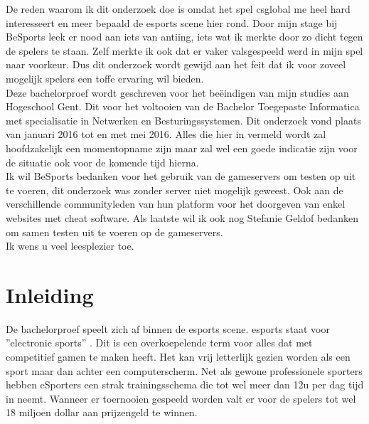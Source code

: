 \documentclass[pdftex,a4paper,12pt,twoside]{report}
\begin{document}
De reden waarom ik dit onderzoek doe is omdat het spel \gls{csglobal} me heel hard interesseert en meer bepaald de \gls{esports} scene hier rond. Door mijn stage bij BeSports leek er nood aan iets van \gls{anti}ing, iets wat ik merkte door zo dicht tegen de spelers te staan. Zelf merkte ik ook dat er vaker valsgespeeld werd in mijn spel naar voorkeur. Dus dit onderzoek wordt gewijd aan het feit dat ik voor zoveel mogelijk spelers een toffe ervaring wil bieden.
\\

Deze bachelorproef wordt geschreven voor het beëindigen van mijn studies aan Hogeschool Gent. Dit voor het voltooien van de Bachelor Toegepaste Informatica met specialisatie in Netwerken en Besturingssystemen. Dit onderzoek vond plaats van januari 2016 tot en met mei 2016. Alles die hier in vermeld wordt zal hoofdzakelijk een momentopname zijn maar zal wel een goede indicatie zijn voor de situatie ook voor de komende tijd hierna.
\\

Ik wil BeSports bedanken voor het gebruik van de gameservers om testen op uit te voeren, dit onderzoek was zonder server niet mogelijk geweest. Ook aan de verschillende communityleden van hun platform voor het doorgeven van enkel websites met \gls{cheat} software. Als laatste wil ik ook nog Stefanie Geldof bedanken om samen testen uit te voeren op de gameservers.
\\

Ik wens u veel leesplezier toe.

\tableofcontents

\printglossary

\chapter{Inleiding}
\label{ch:inleiding}

De bachelorproef speelt zich af binnen de \gls{esports} scene. \gls{esports} staat voor ''electronic sports'' \citep{BenDirs2015}. Dit is een overkoepelende term voor alles dat met competitief gamen te maken heeft. Het kan vrij letterlijk gezien worden als een sport maar dan achter een computerscherm. Net als gewone professionele sporters hebben eSporters een strak trainingsschema die tot wel meer dan 12u per dag tijd in neemt. Wanneer er toernooien gespeeld worden valt er voor de spelers tot wel 18 miljoen dollar aan prijzengeld te winnen. \citep{dota2theinternational} 
\\
\end{document}
